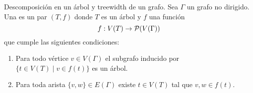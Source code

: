 \documentclass[aspectratio=169, 10pt]{beamer}
\begin{document}
	

	\begin{frame}{Descomposición en un árbol y treewidth de un grafo.}
	Sea $\Gamma$ un grafo no dirigido.
	Una  es un par $(T,f)$ donde
	$T$ es un árbol y $f$ una función 
	\[
	f: V(T) \to {\cal{P}}(V(\Gamma))
	\]
	que cumple las siguientes condiciones:
	\pause 
	\begin{enumerate}
		\item Para todo vértice $v \in V(\Gamma)$ el subgrafo inducido por $\{ t \in V(T) \mid v \in f(t)\}$ es un árbol.

		\item Para toda arista $\{v,w\} \in E(\Gamma)$ 
		 existe $t \in V(T)$ tal que $v,w \in f(t)$. \pause 
		
	\end{enumerate}
	\end{frame}
	
\end{document}
